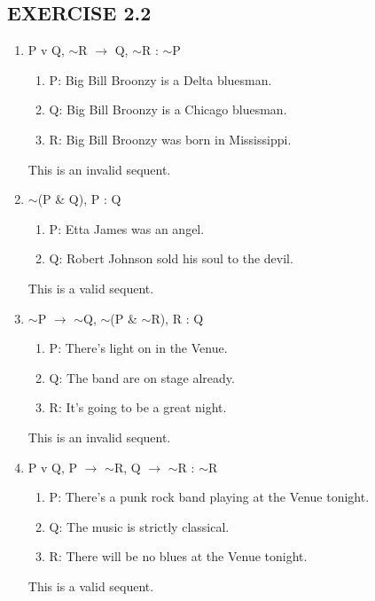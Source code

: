 \documentclass[a4paper,12pt]{article}
\newcommand{\mra}{$\rightarrow$ }
\newcommand{\ms}{$\sim$}
\begin{document}
    \subsection*{EXERCISE 2.2}

    \begin{enumerate}[label=\arabic*,leftmargin=*]

        \item P v Q, \ms R \mra Q, \ms R : \ms P
            \nopagebreak
            \begin{enumerate}[label=(\roman*)]
                \item P: Big Bill Broonzy is a Delta bluesman.
                \item Q: Big Bill Broonzy is a Chicago bluesman.
                \item R: Big Bill Broonzy was born in Mississippi.
            \end{enumerate}
            This is an invalid sequent.

        \item \ms (P \& Q), P : Q
            \nopagebreak
            \begin{enumerate}[label=(\roman*)]
                \item P: Etta James was an angel.
                \item Q: Robert Johnson sold his soul to the devil.
            \end{enumerate}
            This is a valid sequent.

        \item \ms P \mra \ms Q, \ms (P \& \ms R), R : Q
            \nopagebreak
            \begin{enumerate}[label=(\roman*)]
                \item P: There's light on in the Venue.
                \item Q: The band are on stage already.
                \item R: It's going to be a great night.
            \end{enumerate}
            This is an invalid sequent.

        \item P v Q, P \mra \ms R, Q \mra \ms R : \ms R
            \nopagebreak
            \begin{enumerate}[label=(\roman*)]
                \item P: There's a punk rock band playing at the Venue tonight.
                \item Q: The music is strictly classical.
                \item R: There will be no blues at the Venue tonight.
            \end{enumerate}
            This is a valid sequent.


\end{enumerate}
\end{document}
